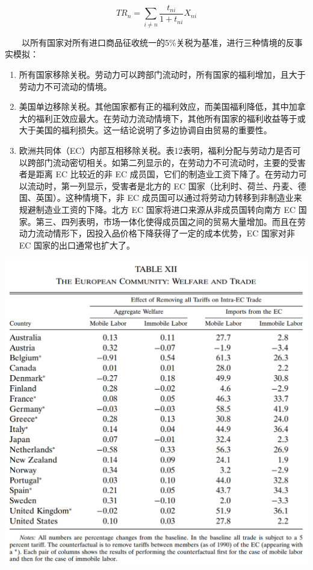 \documentclass[
]{article}
\begin{document}
\[
T R_{n}=\sum_{i \neq n} \frac{t_{n i}}{1+t_{n i}} X_{n i}
\]

　　以所有国家对所有进口商品征收统一的5\%关税为基准，进行三种情境的反事实模拟：

\begin{enumerate}
\def\labelenumi{\arabic{enumi}.}
\item
  所有国家移除关税。劳动力可以跨部门流动时，所有国家的福利增加，且大于劳动力不可流动的情境。
\item
  美国单边移除关税。其他国家都有正的福利效应，而美国福利降低，其中加拿大的福利正效应最大。在劳动力流动情境下，其他所有国家的福利收益等于或大于美国的福利损失。这一结论说明了多边协调自由贸易的重要性。
\item
  欧洲共同体（EC）内部互相移除关税。表12表明，福利分配与劳动力是否可以跨部门流动密切相关。如第二列显示的，在劳动力不可流动时，主要的受害者是距离 EC 比较近的非 EC 成员国，它们的制造业工资下降了。在劳动力可以流动时，第一列显示，受害者是北方的 EC 国家（比利时、荷兰、丹麦、德国、英国）。这种情境下，非 EC 成员国可以通过将劳动力转移到非制造业来规避制造业工资的下降。北方 EC 国家将进口来源从非成员国转向南方 EC 国家。第三、四列表明，市场一体化使得成员国之间的贸易大量增加。而且在劳动力流动情形下，因投入品价格下降获得了一定的成本优势，EC 国家对非 EC 国家的出口通常也扩大了。
\end{enumerate}

\begin{center}\includegraphics[width=1\linewidth]{Figures/Table12} \end{center}
\end{document}
